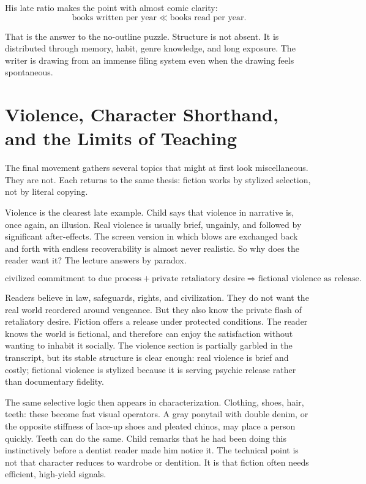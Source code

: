 His late ratio makes the point with almost comic clarity:
\begin{equation}
\text{books written per year} \ll \text{books read per year}.
\end{equation}

That is the answer to the no-outline puzzle. Structure is not absent. It is distributed through memory, habit, genre knowledge, and long exposure. The writer is drawing from an immense filing system even when the drawing feels spontaneous.

\section{Violence, Character Shorthand, and the Limits of Teaching}

The final movement gathers several topics that might at first look miscellaneous. They are not. Each returns to the same thesis: fiction works by stylized selection, not by literal copying.

Violence is the clearest late example. Child says that violence in narrative is, once again, an illusion. Real violence is usually brief, ungainly, and followed by significant after-effects. The screen version in which blows are exchanged back and forth with endless recoverability is almost never realistic. So why does the reader want it? The lecture answers by paradox.

\begin{equation}
\text{civilized commitment to due process} + \text{private retaliatory desire}
\Longrightarrow
\text{fictional violence as release}.
\end{equation}

Readers believe in law, safeguards, rights, and civilization. They do not want the real world reordered around vengeance. But they also know the private flash of retaliatory desire. Fiction offers a release under protected conditions. The reader knows the world is fictional, and therefore can enjoy the satisfaction without wanting to inhabit it socially. The violence section is partially garbled in the transcript, but its stable structure is clear enough: real violence is brief and costly; fictional violence is stylized because it is serving psychic release rather than documentary fidelity.

The same selective logic then appears in characterization. Clothing, shoes, hair, teeth: these become fast visual operators. A gray ponytail with double denim, or the opposite stiffness of lace-up shoes and pleated chinos, may place a person quickly. Teeth can do the same. Child remarks that he had been doing this instinctively before a dentist reader made him notice it. The technical point is not that character reduces to wardrobe or dentition. It is that fiction often needs efficient, high-yield signals.


